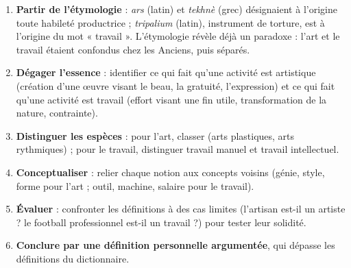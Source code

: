 \documentclass[11pt]{article}
\newcommand{\cle}[1]{{\popxbold\color{popdark}#1}}
\begin{document}
\begin{methode}
\begin{enumerate}
\item \textbf{Partir de l'étymologie} : \emph{ars} (latin) et \emph{tekhnè} (grec) désignaient à l'origine toute habileté productrice ; \emph{tripalium} (latin), instrument de torture, est à l'origine du mot « travail ». L'étymologie révèle déjà un paradoxe : l'art et le travail étaient confondus chez les Anciens, puis séparés.
\item \textbf{Dégager l'essence} : identifier ce qui fait qu'une activité est \cle{artistique} (création d'une œuvre visant le beau, la gratuité, l'expression) et ce qui fait qu'une activité est \cle{travail} (effort visant une fin utile, transformation de la nature, contrainte).
\item \textbf{Distinguer les espèces} : pour l'art, classer (arts plastiques, arts rythmiques) ; pour le travail, distinguer travail manuel et travail intellectuel.
\item \textbf{Conceptualiser} : relier chaque notion aux concepts voisins (génie, style, forme pour l'art ; outil, machine, salaire pour le travail).
\item \textbf{Évaluer} : confronter les définitions à des cas limites (l'artisan est-il un artiste ? le football professionnel est-il un travail ?) pour tester leur solidité.
\item \textbf{Conclure par une définition personnelle argumentée}, qui dépasse les définitions du dictionnaire.
\end{enumerate}
\end{methode}
\end{document}
